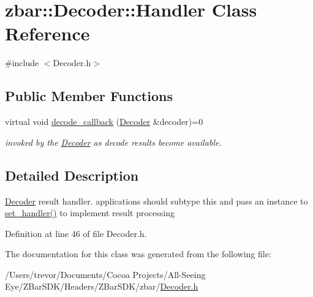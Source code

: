 \hypertarget{classzbar_1_1_decoder_1_1_handler}{
\section{zbar::Decoder::Handler Class Reference}
\label{classzbar_1_1_decoder_1_1_handler}
}


{\ttfamily \#include $<$Decoder.h$>$}

\subsection*{Public Member Functions}
\begin{DoxyCompactItemize}
\item 
\hypertarget{classzbar_1_1_decoder_1_1_handler_a826f3708874b4b12f01193819ec539d4}{
virtual void \hyperlink{classzbar_1_1_decoder_1_1_handler_a826f3708874b4b12f01193819ec539d4}{decode\_\-callback} (\hyperlink{classzbar_1_1_decoder}{Decoder} \&decoder)=0}
\label{classzbar_1_1_decoder_1_1_handler_a826f3708874b4b12f01193819ec539d4}

\begin{DoxyCompactList}\small\item\em invoked by the \hyperlink{classzbar_1_1_decoder}{Decoder} as decode results become available. \end{DoxyCompactList}\end{DoxyCompactItemize}


\subsection{Detailed Description}
\hyperlink{classzbar_1_1_decoder}{Decoder} result handler. applications should subtype this and pass an instance to \hyperlink{classzbar_1_1_decoder_ab545eab12dadb6f0fe106f0fc30e766c}{set\_\-handler()} to implement result processing 

Definition at line 46 of file Decoder.h.



The documentation for this class was generated from the following file:\begin{DoxyCompactItemize}
\item 
/Users/trevor/Documents/Cocoa Projects/All-\/Seeing Eye/ZBarSDK/Headers/ZBarSDK/zbar/\hyperlink{_decoder_8h}{Decoder.h}\end{DoxyCompactItemize}
